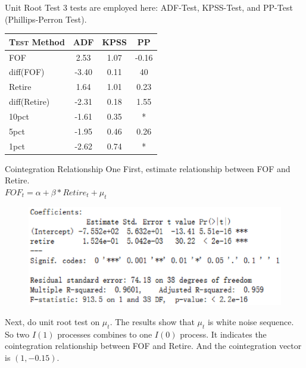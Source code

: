 \documentclass[xcolor=dvipsnames]{beamer}
\begin{document}
\begin{frame}{Unit Root Test}
	3 tests are employed here: ADF-Test, KPSS-Test, and PP-Test (Phillips-Perron Test). \\
	\begin{tabular}{|l| c| c| c|}
	\hline
	\textsc{Test} Method &  ADF   & KPSS &  PP   \\ \hline
	FOF 				 &  2.53  & 1.07 & -0.16 \\ \hline
	diff(FOF) 			 & -3.40  & 0.11 & 40 	 \\ \hline
	Retire 				 &  1.64  & 1.01 & 0.23  \\ \hline
	diff(Retire) 		 & -2.31  & 0.18 & 1.55  \\ \hline
	10pct 				 & -1.61  & 0.35 &   * 	 \\ \hline
	5pct 				 & -1.95  & 0.46 & 0.26  \\ \hline
	1pct 				 & -2.62  & 0.74 &   * \\ \hline

	\end{tabular}

\end{frame}


\begin{frame}{Cointegration Relationship One}
	First, estimate relationship between FOF and Retire.\\
	$FOF_t = \alpha + \beta * Retire_t + \mu_t$
	\begin{center}
	\begin{figure}
		\includegraphics[scale=0.4]{3-3.eps}
	\end{figure}
	\end{center}

	Next, do unit root test on $\mu_t$. The results show that $\mu_t$ is white noise sequence. So two $I(1)$ processes combines to one $I(0)$ process. It indicates the cointegration relationship between FOF and Retire. And the cointegration vector is $(1, -0.15)$.
\end{frame}
\end{document}
